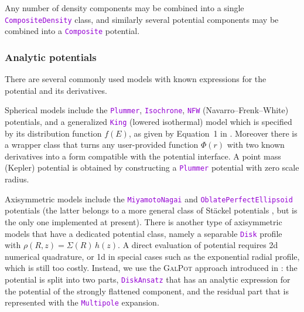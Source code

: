 \documentclass[12pt]{article}
\newcommand{\ttt}[1]{\textcolor{darkviolet}{\texttt{#1}}}
\begin{document}
Any number of density components may be combined into a single \ttt{CompositeDensity} class, and similarly several potential components may be combined into a \ttt{Composite} potential.


\subsubsection{Analytic potentials}  \label{sec:PotentialAnalytic}

There are several commonly used models with known expressions for the potential and its derivatives. 

Spherical models include the \ttt{Plummer}, \ttt{Isochrone}, \ttt{NFW} (Navarro--Frenk--White) potentials, and a generalized \ttt{King} (lowered isothermal) model which is specified by its distribution function $f(E)$, as given by Equation~1 in \cite{GielesZocchi2015}.
Moreover there is a wrapper class that turns any user-provided function $\Phi(r)$ with two known derivatives into a form compatible with the potential interface. A point mass (Kepler) potential is obtained by constructing a \ttt{Plummer} potential with zero scale radius.

Axisymmetric models include the \ttt{MiyamotoNagai} and \ttt{OblatePerfectEllipsoid} potentials (the latter belongs to a more general class of St\"ackel potentials \cite{deZeeuw1985}, but is the only one implemented at present).
There is another type of axisymmetric models that have a dedicated potential class, namely a separable \ttt{Disk} profile with $\rho(R,z) = \Sigma(R)\, h(z)$. A direct evaluation of potential requires 2d numerical quadrature, or 1d in special cases such as the exponential radial profile, which is still too costly. Instead, we use the \textsc{GalPot} approach introduced in \cite{KuijkenDubinski1995, DehnenBinney1998}: the potential is split into two parts, \ttt{DiskAnsatz} that has an analytic expression for the potential of the strongly flattened component, and the residual part that is represented with the \ttt{Multipole} expansion.
\end{document}
